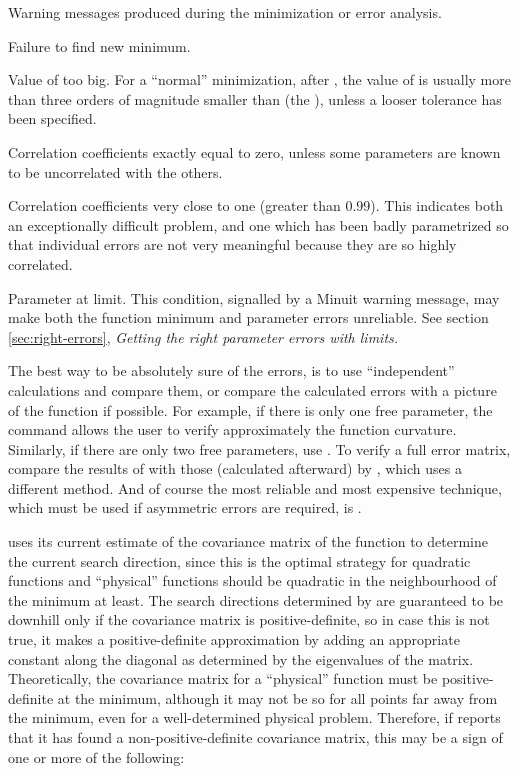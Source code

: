 \begin{UL}
\item Warning messages produced during the minimization or error analysis.
\item Failure to find new minimum.
\item Value of  too big. For a ``normal'' minimization, 
      after , the value of  is usually more 
      than three orders of magnitude smaller than  
      (the ), unless a looser tolerance has been specified.
\item Correlation coefficients exactly equal to zero, unless some parameters
      are known to be uncorrelated with the others.
\item Correlation coefficients very close to one (greater than 0.99).
      This indicates both an exceptionally difficult problem, and one
      which has been badly parametrized so that individual errors are not
      very meaningful because they are so highly correlated.
\item Parameter at limit. This condition, signalled by a Minuit warning
      message, may make both the function minimum and parameter errors
      unreliable. See section \ref{sec:right-errors},
      {\em Getting the right parameter errors with limits.}
\end{UL}

The best way to be absolutely sure of the errors, is to use
``independent'' calculations and compare them, or compare the calculated
errors with a picture of the function if possible.
For example, if there is only one free parameter, the command 
allows the user to verify approximately the function curvature.
Similarly, if there are only two free parameters, use .
To verify a full error matrix, compare the results of 
with those (calculated afterward) by , 
which uses a different method.
And of course the most reliable and most expensive technique,
which must be used if asymmetric errors are required, is .


 uses its current estimate of the covariance matrix of the
function to determine the current search direction, since this is
the optimal strategy for quadratic functions and ``physical'' functions
should be quadratic in the neighbourhood of the minimum at least.
The search directions determined by  are guaranteed to be
downhill only if the covariance matrix is positive-definite,
so in case this is not true, it makes a positive-definite
approximation by adding an appropriate constant along the diagonal
as determined by the eigenvalues of the matrix.
Theoretically, the covariance matrix for a ``physical'' function must be
positive-definite at the minimum, although it may not be so
for all points far away from the minimum, even for a well-determined
physical problem. 
Therefore, if  reports that it has found a
non-positive-definite covariance matrix, this may be
a sign of one or more of the following:

